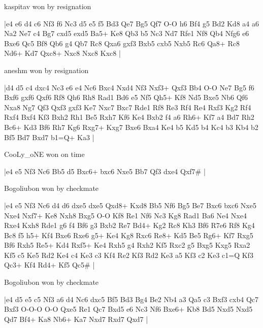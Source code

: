 \showboard

kaspitav won by resignation

\makegametitle
|e4 e6 d4 c6 Nf3 f6 Nc3 d5 e5 f5 Bd3 Qe7 Bg5 Qf7 O-O h6 Bf4 g5 Bd2 Kd8 a4 a6 Na2 Ne7 c4 Bg7 cxd5 exd5 Ba5+ Ke8 Qb3 b5 Nc3 Nd7 Rfe1 Nf8 Qb4 Nfg6 e6 Bxe6 Qc5 Bf8 Qb6 g4 Qb7 Rc8 Qxa6 gxf3 Bxb5 cxb5 Nxb5 Rc6 Qa8+ Rc8 Nd6+ Kd7 Qxc8+ Nxc8 Nxc8 Kxc8  |

\showboard

aneshm won by resignation

\makegametitle
|d4 d5 c4 dxc4 Nc3 e6 e4 Nc6 Bxc4 Nxd4 Nf3 Nxf3+ Qxf3 Bb4 O-O Ne7 Bg5 f6 Bxf6 gxf6 Qxf6 Rf8 Qh6 Rh8 Rad1 Bd6 e5 Nf5 Qh5+ Kf8 Nd5 Bxe5 Nb6 Qf6 Nxa8 Ng7 Qf3 Qxf3 gxf3 Ke7 Nxc7 Bxc7 Rde1 Rf8 Re3 Rf4 Re4 Rxf3 Kg2 Rf4 Rxf4 Bxf4 Kf3 Bxh2 Rh1 Be5 Rxh7 Kf6 Ke4 Bxb2 f4 a6 Rh6+ Kf7 a4 Bd7 Rh2 Bc6+ Kd3 Bf6 Rh7 Kg6 Rxg7+ Kxg7 Bxe6 Bxa4 Ke4 b5 Kd5 b4 Kc4 b3 Kb4 b2 Bf5 Bd7 Bxd7 b1=Q+ Ka3  |

\showboard

CooLy\_oNE won on time

\makegametitle
|e4 e5 Nf3 Nc6 Bb5 d5 Bxc6+ bxc6 Nxe5 Bb7 Qf3 dxe4 Qxf7\#  |

\showboard

Bogoliubon won by checkmate

\makegametitle
|e4 e5 Nf3 Nc6 d4 d6 dxe5 dxe5 Qxd8+ Kxd8 Bb5 Nf6 Bg5 Be7 Bxc6 bxc6 Nxe5 Nxe4 Nxf7+ Ke8 Nxh8 Bxg5 O-O Kf8 Re1 Nf6 Nc3 Kg8 Rad1 Ba6 Ne4 Nxe4 Rxe4 Kxh8 Rde1 g6 f4 Bf6 g3 Bxb2 Re7 Bd4+ Kg2 Rc8 Kh3 Bf6 R7e6 Rf8 Kg4 Bc8 f5 h5+ Kf4 Bxe6 Rxe6 g5+ Ke4 Kg8 Rxc6 Re8+ Kd5 Be5 Rg6+ Kf7 Rxg5 Bf6 Rxh5 Re5+ Kd4 Rxf5+ Ke4 Rxh5 g4 Rxh2 Kf5 Rxc2 g5 Bxg5 Kxg5 Rxa2 Kf5 c5 Ke5 Rd2 Ke4 c4 Ke3 c3 Kf4 Re2 Kf3 Rd2 Ke3 a5 Kf3 c2 Ke3 c1=Q Kf3 Qc3+ Kf4 Rd4+ Kf5 Qc5\#  |

\showboard

Bogoliubon won by checkmate

\makegametitle
|e4 d5 e5 c5 Nf3 a6 d4 Nc6 dxc5 Bf5 Bd3 Bg4 Be2 Nb4 a3 Qa5 c3 Bxf3 cxb4 Qc7 Bxf3 O-O-O O-O Qxe5 Re1 Qc7 Bxd5 e6 Nc3 Nf6 Bxe6+ Kb8 Bd5 Nxd5 Nxd5 Qd7 Bf4+ Ka8 Nb6+ Ka7 Nxd7 Rxd7 Qxd7  |

